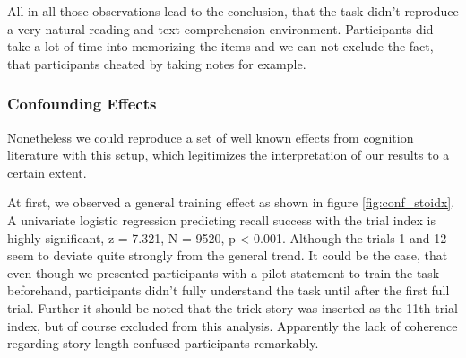 \documentclass[a4paper,man,natbib,floatsintext,import]{apa6}
\begin{document}
All in all those observations lead to the conclusion, that the task didn't reproduce a very natural reading and text comprehension environment. Participants did take a lot of time into memorizing the items and we can not exclude the fact, that participants cheated by taking notes for example.


\subsubsection{Confounding Effects}
Nonetheless we could reproduce a set of well known effects from cognition literature with this setup, which legitimizes the interpretation of our results to a certain extent.

At first, we observed a general training effect as shown in figure \ref{fig:conf_stoidx}. A univariate logistic regression predicting recall success with the trial index is highly significant, z = 7.321, N = 9520, p < 0.001. Although the trials 1 and 12 seem to deviate quite strongly from the general trend. It could be the case, that even though we presented participants with a pilot statement to train the task beforehand, participants didn't fully understand the task until after the first full trial. Further it should be noted that the trick story was inserted as the 11th trial index, but of course excluded from this analysis. Apparently the lack of coherence regarding story length confused participants remarkably.
\end{document}
